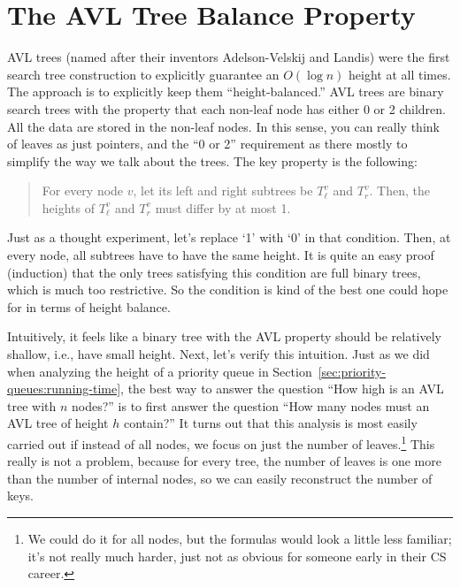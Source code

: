 \section{The AVL Tree Balance Property}
\label{sec:AVL:balance}
AVL trees (named after their inventors Adelson-Velskij and Landis)
were the first search tree construction to explicitly guarantee an
$O(\log n)$ height at all times. 
The approach is to explicitly keep them ``height-balanced.''
AVL trees are binary search trees with the property that each non-leaf
node has either 0 or 2 children. 
All the data are stored in the non-leaf nodes. 
In this sense, you can really think of leaves as just 
pointers, and the ``0 or 2'' requirement as there mostly to simplify
the way we talk about the trees. The key property is the following:

\begin{quote}
For every node $v$, let its left and right subtrees be $T^v_{\ell}$ and $T^v_r$.
Then, the heights of $T^v_{\ell}$ and $T^v_r$ must differ by at most 1.
\end{quote}

Just as a thought experiment, let's replace `1' with `0' in that
condition. 
Then, at every node, all subtrees have to have the same height. 
It is quite an easy proof (induction) that the only trees satisfying
this condition are full binary trees, which is much too restrictive.
So the condition is kind of the best one could hope for in terms of
height balance.

Intuitively, it feels like a binary tree with the AVL property should
be relatively shallow, i.e., have small height. 
Next, let's verify this intuition.
Just as we did when analyzing the height of a priority queue in
Section~\ref{sec:priority-queues:running-time}, the best way to answer
the question ``How high is an AVL tree with $n$ nodes?'' is to 
first answer the question ``How many nodes must an AVL tree
of height $h$ contain?''
It turns out that this analysis is most easily carried out if instead
of all nodes, we focus on just the number of leaves.\footnote{We could
  do it for all nodes, but the formulas would look a little less
  familiar; it's not really much harder, just not as obvious for
  someone early in their CS career.}
This really is not a problem, because for every tree, the number of
leaves is one more than the number of internal nodes, so we can easily
reconstruct the number of keys.

